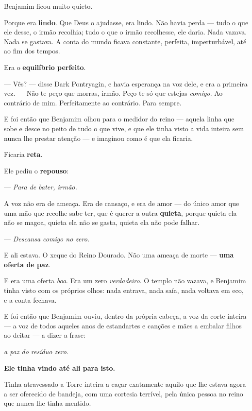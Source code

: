 \documentclass[livro.tex]{subfiles}
\begin{document}
Benjamim ficou muito quieto.

Porque era \textbf{lindo}. Que Deus o ajudasse, era lindo. Não havia perda --- tudo o que ele desse, o irmão
recolhia; tudo o que o irmão recolhesse, ele daria. Nada vazava. Nada se gastava. A conta do mundo ficava
constante, perfeita, imperturbável, até ao fim dos tempos.

Era o \textbf{equilíbrio perfeito}.

--- Vês? --- disse Dark Pontryagin, e havia esperança na voz dele, e era a primeira vez. --- Não te peço que
morras, irmão. Peço-te só que estejas \emph{comigo}. Ao contrário de mim. Perfeitamente ao contrário. Para sempre.

\medskip

E foi então que Benjamim olhou para o medidor do reino --- aquela linha que sobe e desce no peito de tudo o que
vive, e que ele tinha visto a vida inteira sem nunca lhe prestar atenção --- e imaginou como é que ela ficaria.

\medskip

Ficaria \textbf{reta}.

\medskip

Ele pediu o \textbf{repouso}:

--- \emph{Para de bater, irmão.}

A voz não era de ameaça. Era de cansaço, e era de amor --- do único amor que uma mão que recolhe sabe ter, que é
querer a outra \textbf{quieta}, porque quieta ela não se magoa, quieta ela não se gasta, quieta ela não pode
falhar.

--- \emph{Descansa comigo no zero.}

\medskip

E ali estava. O xeque do Reino Dourado. Não uma ameaça de morte --- \textbf{uma oferta de paz}.

E era uma oferta \emph{boa}. Era um zero \emph{verdadeiro}. O templo não vazava, e Benjamim tinha visto com os
próprios olhos: nada entrava, nada saía, nada voltava em eco, e a conta fechava.

\medskip

E foi então que Benjamim ouviu, dentro da própria cabeça, a voz da corte inteira --- a voz de todos aqueles anos de
estandartes e canções e mães a embalar filhos ao deitar --- a dizer a frase:

\emph{a paz do resíduo zero.}

\textbf{Ele tinha vindo até ali para isto.}

Tinha atravessado a Torre inteira a caçar exatamente aquilo que lhe estava agora a ser oferecido de bandeja, com uma
cortesia terrível, pela única pessoa no reino que nunca lhe tinha mentido.
\end{document}

